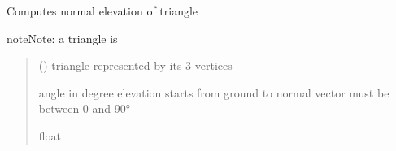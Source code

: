 \documentclass[letterpaper,10pt,english]{sphinxmanual}
\begin{document}

\begin{fulllineitems}
\label{\detokenize{reference:basicgeometry.triangle_elevation}}
\pysigstartsignatures
{}
\pysigstopsignatures
\sphinxAtStartPar
Computes normal elevation of triangle

\begin{sphinxadmonition}{note}{Note:}
\sphinxAtStartPar
a triangle is \sphinxcode{\sphinxupquote{{[}(x1,y1,z1),(x2,y2,z2),(x3,y3,z3){]}}}
\end{sphinxadmonition}
\begin{quote}\begin{description}
\sphinxAtStartPar
{} () \textendash{} triangle represented by its 3 vertices

\sphinxAtStartPar
angle in degree 
elevation starts from ground to normal vector
must be between 0 and 90°

\sphinxAtStartPar
float

\end{description}\end{quote}

\end{fulllineitems}

\end{document}
